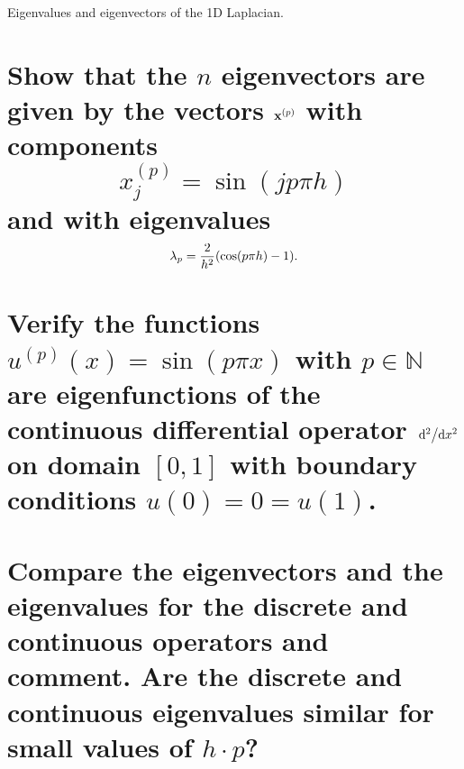 \documentclass[boxes,pages]{homework}
\begin{document}
\begin{problem}
Eigenvalues and eigenvectors of the 1D Laplacian.
\begin{parts}
	\part{Show that the $n$ eigenvectors are given by the vectors $\vb{x}^{(p)}$ with components
		\begin{equation*}
			x_j^{(p)} = \sin(jp\pi h)
		\end{equation*}
		and with eigenvalues
		\begin{equation*}
			\lambda_p = \frac{2}{h^2}\qty(\cos(p\pi h) - 1).
		\end{equation*}}\label{part:1a}
	\part{Verify the functions $u^{(p)}(x) = \sin(p\pi x)$ with $p\in\mathbb{N}$ are eigenfunctions of the continuous differential operator $\dv*[2]{x}$ on domain $[0, 1]$ with boundary conditions $u(0) = 0 = u(1)$.}\label{part:1b}
	\part{Compare the eigenvectors and the eigenvalues for the discrete and continuous operators and comment. Are the discrete and continuous eigenvalues similar for small values of $h\cdot p$?}\label{part:1c}
\end{parts}
\end{problem}
\end{document}
